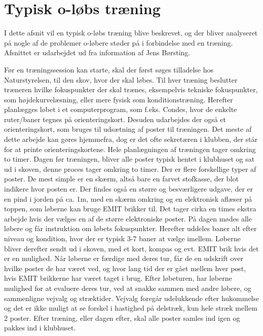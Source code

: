 \newpage
\section{Typisk o-løbs træning}
I dette afsnit vil en typisk o-løbs træning blive beskrevet, og der bliver analyseret på nogle af de problemer o-løbere støder på i forbindelse med en træning. Afsnittet er udarbejdet ud fra information af Jens Børsting.

Før en træningssession kan starte, skal der først søges tilladelse hos Naturstyrelsen, til den skov, hvor der skal løbes. \newline
Til hver træning beslutter træneren hvilke fokuspunkter der skal trænes, eksempelvis tekniske fokuspunkter, som højdekurvelæsning, eller mere fysisk som konditionstræning. Herefter planlægges løbet i et computerprogram, som f.eks. Condes, hvor de enkelte ruter/baner tegnes på orienteringskort. Desuden udarbejdes der også et orienteringskort, som bruges til udsætning af poster til træningen. Det meste af dette arbejde kan gøres hjemmefra, dog er det ofte sekretæren i klubben, der står for at printe orienteringskortene. Hele planlægningen af træningen tager omkring to timer. Dagen før træningen, bliver alle poster typisk hentet i klubhuset og sat ud i skoven, denne proces tager omkring to timer. Der er flere forskellige typer af poster. De mest simple er en skærm, altså bare en farvet stofkasse, der blot indikere hvor posten er. Der findes også en større og besværligere udgave, der er en pind i jorden på ca. 1m, med en skærm omkring og en elektronisk aflæser på toppen, som løberne kan bruge EMIT brikker til. Det tager cirka en times ekstra arbejde hvis der vælges en af de større elektroniske poster.\newline
På dagen mødes alle løbere og får instruktion om løbets fokuspunkter. Herefter uddeles baner alt efter niveau og kondition, hvor der er typisk 3-7 baner at vælge imellem. Løberne bliver derefter sendt ud i skoven, med et kort, kompas og evt. EMIT brik hvis det er en mulighed. Når løberne er færdige med deres tur, får de en udskrift over hvilke poster de har været ved, og hvor lang tid der er gået mellem hver post, hvis EMIT brikkerne har været taget i brug.
Efter løbeturen, har løberne mulighed for at evaluere deres tur, ved at snakke sammen med andre løbere, og sammenligne vejvalg og stræktider. Vejvalg foregår udelukkende efter hukommelse og det er ikke muligt at se forskel i hastighed på delstræk, kun hele stræk mellem 2 poster. 
Efter træning, eller dagen efter, skal alle poster samles ind igen og pakkes ind i klubhuset.\newline


